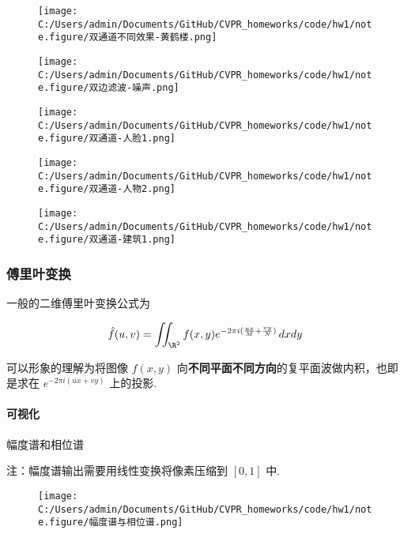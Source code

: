 \documentclass[
]{article}
\begin{document}
\begin{figure}
\centering
\texttt{[image: C:/Users/admin/Documents/GitHub/CVPR\_homeworks/code/hw1/note.figure/双通道不同效果-黄鹤楼.png]}
\caption{}
\end{figure}

\begin{figure}
\centering
\texttt{[image: C:/Users/admin/Documents/GitHub/CVPR\_homeworks/code/hw1/note.figure/双边滤波-噪声.png]}
\caption{}
\end{figure}

\begin{figure}
\centering
\texttt{[image: C:/Users/admin/Documents/GitHub/CVPR\_homeworks/code/hw1/note.figure/双通道-人脸1.png]}
\caption{}
\end{figure}

\begin{figure}
\centering
\texttt{[image: C:/Users/admin/Documents/GitHub/CVPR\_homeworks/code/hw1/note.figure/双通道-人物2.png]}
\caption{}
\end{figure}

\begin{figure}
\centering
\texttt{[image: C:/Users/admin/Documents/GitHub/CVPR\_homeworks/code/hw1/note.figure/双通道-建筑1.png]}
\caption{}
\end{figure}

\hypertarget{ux5085ux91ccux53f6ux53d8ux6362}{%
\subsubsection{傅里叶变换}\label{ux5085ux91ccux53f6ux53d8ux6362}}

一般的二维傅里叶变换公式为

\[\hat{f}(u,v) = \iint_{\R^2}f(x, y)e^{-2\pi i(\frac{ux}{M}+\frac{vy}{N})}\,dxdy\]

可以形象的理解为将图像 \(f(x,y)\)
向\textbf{不同平面不同方向}的复平面波做内积，也即是求在
\(e^{-2\pi i(ux+vy)}\) 上的投影.

\hypertarget{ux53efux89c6ux5316}{%
\paragraph{可视化}\label{ux53efux89c6ux5316}}

幅度谱和相位谱

注：幅度谱输出需要用线性变换将像素压缩到 \([0,1]\) 中.

\begin{figure}
\centering
\texttt{[image: C:/Users/admin/Documents/GitHub/CVPR\_homeworks/code/hw1/note.figure/幅度谱与相位谱.png]}
\caption{}
\end{figure}
\end{document}
